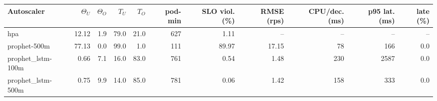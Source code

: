 \begin{tabular}{lrrrrrrrrrr}
\toprule
Autoscaler & $\Theta_U$ & $\Theta_O$ & $T_U$ & $T_O$ & pod-min & SLO viol. (\%) & RMSE (rps) & CPU/dec. (ms) & p95 lat. (ms) & late (\%) \\
\midrule
hpa & 12.12 & 1.9 & 79.0 & 21.0 & 627 & 1.11 & -- & -- & -- & -- \\
prophet-500m & 77.13 & 0.0 & 99.0 & 1.0 & 111 & 89.97 & 17.15 & 78 & 166 & 0.0 \\
prophet\_lstm-100m & 0.66 & 7.1 & 16.0 & 83.0 & 761 & 0.54 & 1.48 & 230 & 2587 & 0.0 \\
prophet\_lstm-500m & 0.75 & 9.9 & 14.0 & 85.0 & 781 & 0.06 & 1.42 & 158 & 333 & 0.0 \\
\bottomrule
\end{tabular}
